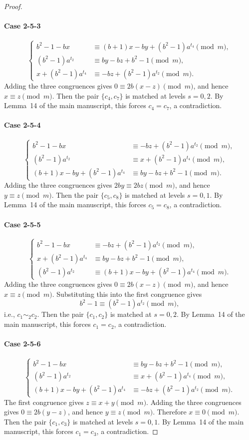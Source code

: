 \documentclass[11pt]{article}
\newcommand{\mymod}{\pmod{m}}
\begin{document}
\begin{proof}
\paragraph{Case 2-5-3}
$$
\begin{cases}
	b^2-1-bx &\equiv  (b+1)x-by+(b^2-1)a^{t_4}\mymod,\\
	(b^2-1)a^{t_2} &\equiv by-bz+b^2-1\mymod, \\
	x+(b^2-1)a^{t_4}&\equiv -bz+(b^2-1)a^{t_2}\mymod.
\end{cases}
$$
Adding the three congruences gives $0\equiv2b(x-z)\mymod$, and hence
$x\equiv z\mymod$. Then the pair $\{c_4,c_7\}$ is matched at levels $s=0,2$. By Lemma~14 of the main manuscript, this forces $c_4=c_7$, a
contradiction.

\paragraph{Case 2-5-4}
$$
\begin{cases}
	b^2-1-bx &\equiv -bz+(b^2-1)a^{t_2}\mymod, \\
	(b^2-1)a^{t_2} &\equiv x+(b^2-1)a^{t_4}\mymod, \\
	(b+1)x -by+(b^2-1)a^{t_4} &\equiv by-bz+b^2-1\mymod.
\end{cases}
$$
Adding the three congruences gives $2by\equiv2bz\mymod$, and hence
$y\equiv z\mymod$. Then the pair $\{c_5,c_8\}$ is matched at levels $s=0,1$. By Lemma~14 of the main manuscript, this forces $c_5=c_8$, a
contradiction.

\paragraph{Case 2-5-5}
$$
\begin{cases}
	b^2-1-bx &\equiv -bz+(b^2-1)a^{t_2}\mymod, \\
	x+(b^2-1)a^{t_4} &\equiv by-bz+b^2-1\mymod, \\
	  (b^2-1)a^{t_2}&\equiv (b+1)x-by+(b^2-1)a^{t_4}\mymod.
\end{cases}
$$
Adding the three congruences gives $0\equiv2b(x-z)\mymod$, and hence
$x\equiv z\mymod$. Substituting this into the first congruence gives
$$
b^2-1\equiv (b^2-1)a^{t_2}\mymod,
$$
i.e., $c_1\sim_2 c_2$.
Then the pair $\{c_1,c_2\}$ is matched at $s=0,2$. By Lemma~14 of the main manuscript, this forces $c_1=c_2$, a contradiction.

\paragraph{Case 2-5-6}
$$
\begin{cases}
	b^2-1-bx &\equiv by-bz+b^2-1\mymod, \\
	(b^2-1)a^{t_2} &\equiv x+(b^2-1)a^{t_4}\mymod, \\
	(b+1)x-by+(b^2-1)a^{t_4} &\equiv -bz+(b^2-1)a^{t_2}\mymod.
\end{cases}
$$
The first congruence gives $z\equiv x+y\mymod$. Adding the three
congruences gives $0\equiv2b(y-z)$, and hence $y\equiv z\mymod$.
Therefore $x\equiv0\mymod$. Then the pair $\{c_1,c_3\}$ is matched at levels $s=0,1$. By Lemma~14 of the main manuscript, this forces $c_1=c_3$, a contradiction.


\end{proof}
\end{document}
